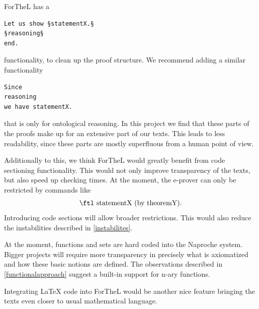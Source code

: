 \documentclass[11pt]{article}
\begin{document}
ForTheL has a 
\begin{lstlisting}
Let us show §statementX.§
§reasoning§
end.
\end{lstlisting} 
functionality, to clean up the proof structure. We recommend adding a similar functionality
\begin{lstlisting}
Since 
reasoning
we have statementX.
\end{lstlisting} 
that is only for ontological reasoning. In this project we find that these parts of the proofs make up for an extensive part of our texts. This leads to less readability, since these parts are mostly superfluous from a human point of view.

Additionally to this, we think ForTheL would greatly benefit from code sectioning functionality. This would not only improve transparency of the texts, but also speed up checking times. At the moment, the e-prover can only be restricted by commands like
$$\text{\ftl statementX (by theoremY).}$$
Introducing code sections will allow broader restrictions. This would also reduce the instabilities described in \ref{instabilites}.

At the moment, functions and sets are hard coded into the Naproche system. Bigger projects will require more transparency in precisely what is axiomatized and how these basic notions are defined. The observations described in \ref{functionalapproach} suggest a built-in support for n-ary functions.

Integrating LaTeX code into ForTheL would be another nice feature bringing the texts even closer to usual mathematical language.
\end{document}
